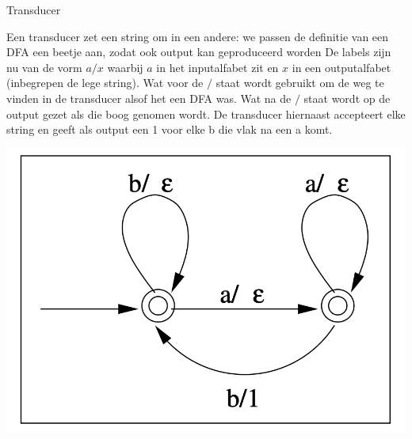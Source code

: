 \begin{theo}[Transducer]{Transducer}
    \begin{minipage}{.66\textwidth}
        Een transducer zet een string om in een andere: we passen de definitie van een DFA een beetje aan, zodat ook output kan geproduceerd worden
        De labels zijn nu van de vorm $a/x$ waarbij $a$ in het inputalfabet zit en $x$ in een outputalfabet (inbegrepen de lege string). 
        Wat voor de $/$ staat wordt gebruikt om de weg te vinden in de transducer alsof het een DFA was. Wat na de $/$ staat wordt op de output gezet als die boog genomen wordt. 
        De transducer hiernaast accepteert elke string en geeft als output een 1 voor elke b die vlak na een a komt.
    \end{minipage}
    \begin{minipage}{.3\textwidth}
        \vspace{-0.3cm}\hspace{0.3cm}\includegraphics[scale = 0.3]{Images/Transducer.png}
    \end{minipage}
\end{theo}

\newpage

